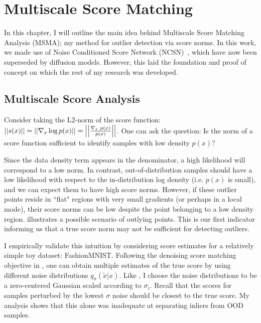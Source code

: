 \chapter{Multiscale Score Matching}
\label{ch:msma}

In this chapter, I will outline the main idea behind Multiscale Score Matching Analysis (MSMA); my method for outlier detection via score norms. In this work, we made use of Noise Conditioned Score Network (NCSN)~\cite{Song2019}, which have now been superseded by diffusion models. However, this laid the foundation and proof of concept on which the rest of my research was developed.

\section{Multiscale Score Analysis}

Consider taking the L2-norm of the score function:
$ \left|\left| { s(x) } \right|\right| = \left|\left| { \nabla_{x} \log p(x)  } \right|\right| = \left|\left| { \frac{\nabla_{x}\text{~}p(x)}{p(x)} } \right|\right| $.
One can ask the question: Is the norm of a score function sufficient to identify samples with low density $p(x)$?

Since the data density term appears in the denominator, a high likelihood will correspond to a low norm. In contrast, out-of-distribution samples should have a low likelihood with respect to the in-distribution log density (i.e. $p(x)$ is small), and we can expect them to have high score norms. However, if these outlier points reside in ``flat" regions with very small gradients (or perhaps in a local mode),  their score norms can be low despite the point belonging to a low density region. 
 illustrates a possible scenario of outlying points.
This is our first indicator informing us that a true score norm may not be sufficient for detecting outliers. 

I empirically validate this intuition by considering score estimates for a relatively simple toy dataset: FashionMNIST. Following the denoising score matching objective in , one can obtain multiple estimates of the true score by using different noise distributions $q_{\sigma}(\tilde{x}|x)$. Like \cite{Song2019}, I choose the noise distributions to be a zero-centered Gaussian scaled according to $\sigma_i$. Recall that the scores for samples perturbed by the lowest $\sigma$ noise should be closest to the true score. My analysis shows that this alone was inadequate at separating inliers from OOD samples.

